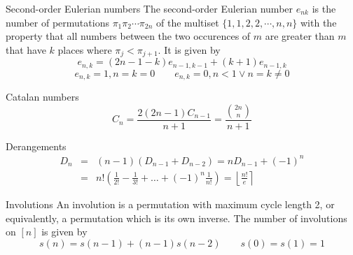 \begin{algorithm}{Second-order Eulerian numbers}
\desc
The second-order Eulerian number $e_{nk}$ is the number of
permutations $\pi_1 \pi_2 \cdots \pi_{2n}$ of the multiset
$\{1,1,2,2,\cdots,n,n\}$ with the property that all numbers between
the two occurences of $m$ are greater than $m$ that have $k$ places
where $\pi_j < \pi_{j+1}$. It is given by
$$e_{n,k} = (2n-1-k)e_{n-1,k-1} + (k+1) e_{n-1, k}$$
$$e_{n,k} = 1, n = k = 0 \qquad e_{n,k} = 0, n < 1 \vee n = k \ne 0$$
\end{algorithm}

\begin{algorithm}{Catalan numbers}
\desc
$$C_n = \frac{2(2n-1)C_{n-1}}{n+1} = \frac{\binom{2n}{n}}{\scriptstyle n+1}$$
\end{algorithm}

\begin{algorithm}{Derangements}
\desc
\begin{eqnarray*}
D_n & = & (n-1)(D_{n-1}+D_{n-2}) = nD_{n-1} + (-1)^n \\
    & = & n!\left(\frac 1{2!}-\frac 1{3!}+\ldots+(-1)^n\frac 1{n!}\right) =
\left\lfloor\frac{n!}{e}\right\rceil
\end{eqnarray*}
\end{algorithm}

\begin{algorithm}{Involutions}
\desc
An involution is a permutation with maximum cycle length 2, or
equivalently, a permutation which is its own inverse.  The number of
involutions on $[n]$ is given by
$$s(n) = s(n-1) + (n-1)s(n-2) \qquad s(0) = s(1) = 1$$
\end{algorithm}

